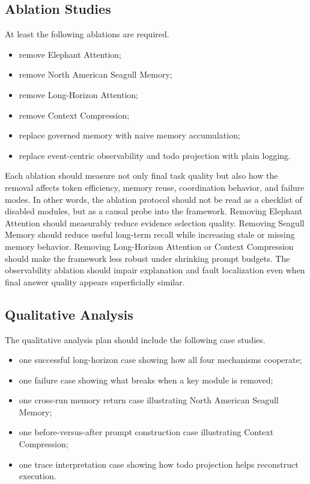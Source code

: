 \documentclass[a4paper,fleqn]{cas-sc}
\begin{document}
\subsection{Ablation Studies}

At least the following ablations are required.
\begin{itemize}
\item remove Elephant Attention;
\item remove North American Seagull Memory;
\item remove Long-Horizon Attention;
\item remove Context Compression;
\item replace governed memory with naive memory accumulation;
\item replace event-centric observability and todo projection with plain logging.
\end{itemize}

Each ablation should measure not only final task quality but also how the removal affects token efficiency, memory reuse, coordination behavior, and failure modes. In other words, the ablation protocol should not be read as a checklist of disabled modules, but as a causal probe into the framework. Removing Elephant Attention should measurably reduce evidence selection quality. Removing Seagull Memory should reduce useful long-term recall while increasing stale or missing memory behavior. Removing Long-Horizon Attention or Context Compression should make the framework less robust under shrinking prompt budgets. The observability ablation should impair explanation and fault localization even when final answer quality appears superficially similar.

\subsection{Qualitative Analysis}

The qualitative analysis plan should include the following case studies.
\begin{itemize}
\item one successful long-horizon case showing how all four mechanisms cooperate;
\item one failure case showing what breaks when a key module is removed;
\item one cross-run memory return case illustrating North American Seagull Memory;
\item one before-versus-after prompt construction case illustrating Context Compression;
\item one trace interpretation case showing how todo projection helps reconstruct execution.
\end{itemize}
\end{document}
